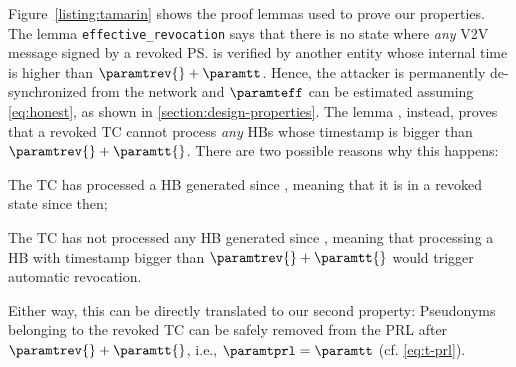 Figure~\ref{listing:tamarin} shows the proof lemmas used to prove our properties. The
lemma \texttt{effective\_revocation} says that there is no state where
\emph{any} \ac{V2V} message signed by a revoked \ps{} is verified by another entity whose
internal time is higher than $\paramtrev{} + \paramtt$. Hence, the attacker is
permanently de-synchronized from the network and $\paramteff$ can be estimated
assuming \cref{eq:honest}, as shown in \cref{section:design-properties}. The
lemma , instead, proves
that a revoked \ac{TC} cannot process \emph{any} \acp{HB} whose timestamp is
bigger than $\paramtrev{} + \paramtt{}$. There are two possible reasons why this
happens:
%
\begin{paraenum}
  \item The \ac{TC} has processed a \ac{HB} generated since \paramtrev{},
  meaning that it is in a revoked state since then;
  \item The \ac{TC} has not processed any \ac{HB} generated since \paramtrev{},
  meaning that processing a \ac{HB} with timestamp bigger than $\paramtrev{} +
  \paramtt{}$ would trigger automatic revocation.
\end{paraenum}
%
Either way, this can be directly translated to our second property: Pseudonyms
belonging to the revoked \ac{TC} can be safely removed from the \ac{PRL} after
$\paramtrev{} + \paramtt{}$, i.e., $\paramtprl = \paramtt$ (cf.
\cref{eq:t-prl}).
